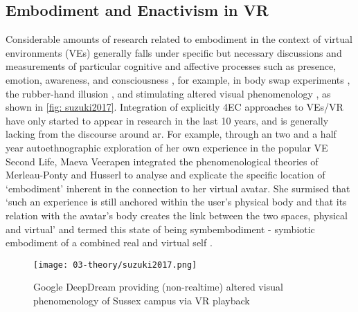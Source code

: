 \subsection{Embodiment and Enactivism in VR}\label{sec: theory-embodimentvr}
Considerable amounts of research related to embodiment in the context of virtual environments (VEs) generally falls under specific but necessary discussions and measurements of particular cognitive and affective processes such as presence, emotion, awareness, and consciousness \citep[]{slater1994,seth2012}, for example, in body swap experiments \citep[]{slater2010}, the rubber-hand illusion \citep[]{suzuki2013}, and stimulating altered visual phenomenology \citep[]{suzuki2017}, as shown in \autoref{fig: suzuki2017}. Integration of explicitly 4EC approaches to VEs/VR have only started to appear in research in the last 10 years, and is generally lacking from the discourse around \gls{ar}. For example, through an two and a half year autoethnographic exploration of her own experience in the popular VE Second Life, Maeva Veerapen integrated the phenomenological theories of Merleau-Ponty and Husserl to analyse and explicate the specific location of `embodiment' inherent in the connection to her virtual avatar. She surmised that `such an experience is still anchored within the user's physical body and that its relation with the avatar's body creates the link between the two spaces, physical and virtual' and termed this state of being symbembodiment - symbiotic embodiment of a combined real and virtual self \citep[]{veerapen2011}. 
\begin{wrapfigure}{r}{0.45\textwidth}
    \hfill
    \begin{minipage}{0.95\linewidth}
        \texttt{[image: 03-theory/suzuki2017.png]}
        \captionsetup{justification=justified}
        \caption{Google DeepDream providing (non-realtime) altered visual phenomenology of Sussex campus via VR playback \citep[from][]{suzuki2017a}}\label{fig: suzuki2017}
    \end{minipage}
\end{wrapfigure}

